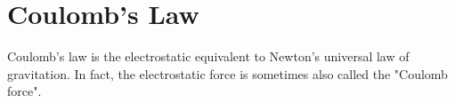 \chapter{Coulomb's Law}

Coulomb's law is the electrostatic equivalent
to Newton's universal law of gravitation.
In fact, the electrostatic force is sometimes also called the "Coulomb force".
